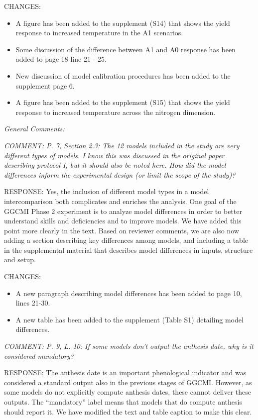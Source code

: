 \documentclass[gmd, manuscript]{copernicus} %
\begin{document}
CHANGES:
\begin{itemize}
    \item A figure has been added to the supplement (S14) that shows the yield response to increased temperature in the A1 scenarios. 
    \item Some discussion of the difference between A1 and A0 response has been added to page 18 line 21 - 25.
    \item New discussion of model calibration procedures has been added to the supplement page 6.
    \item A figure has been added to the supplement (S15) that shows the yield response to increased temperature across the nitrogen dimension.
\end{itemize}


\smallskip

\textcolor{dark-gray}{\textit{General Comments:}}

\textcolor{dark-gray}{\textit{COMMENT: P. 7, Section 2.3: The 12 models included in the study are very different types of models. I know this was discussed in the original paper describing protocol I, but it should also be noted here. How did the model differences inform the experimental design (or limit the scope of the study)?}}

RESPONSE: Yes, the inclusion of different model types in a model intercomparison both complicates and enriches the analysis. One goal of the GGCMI Phase 2 experiment is to analyze model differences in order to better understand skills and deficiencies and to improve models. We have added this point more clearly in the text. Based on reviewer comments, we are also now adding a section describing key differences among models, and including a table in the supplemental material that describes model differences in inputs, structure and setup.
\smallskip

CHANGES:
\begin{itemize}
    \item A new paragraph describing model differences has been added to page 10, lines 21-30.
    \item A new table has been added to the supplement (Table S1) detailing model differences.
\end{itemize}

\smallskip
\textcolor{dark-gray}{\textit{COMMENT: P. 9, L. 10: If some models don’t output the anthesis date, why is it considered mandatory?}}

RESPONSE: The anthesis date is an important phenological indicator and was considered a standard output also in the previous stages of GGCMI. However, as some models do not explicitly compute anthesis dates, these cannot deliver these outputs. The “mandatory” label means that models that do compute anthesis should report it. We have modified the text and table caption to make this clear.
\smallskip
\end{document}
